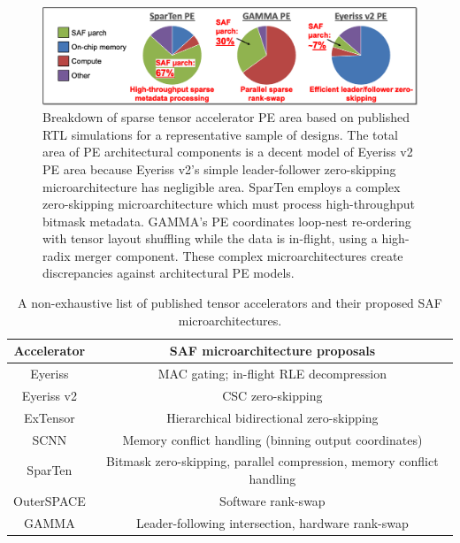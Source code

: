 %
%
\begin{figure}[ht]
\includegraphics[width=\textwidth]{figures/saf_uarch_significance.PNG}
\caption{Breakdown of sparse tensor accelerator PE area based on published RTL simulations for a representative sample of designs. The total area of PE architectural components is a decent model of Eyeriss v2\cite{eyerissv2} PE area because Eyeriss v2's simple leader-follower zero-skipping microarchitecture has negligible area. SparTen\cite{sparten} employs a complex zero-skipping microarchitecture which must process high-throughput bitmask metadata. GAMMA's\cite{gamma} PE coordinates loop-nest re-ordering with tensor layout shuffling while the data is in-flight, using a high-radix merger component. These complex microarchitectures create discrepancies against architectural PE models.}
\label{fig:saf_uarch_significance}
\centering
\end{figure}
%
%
\begin{table}[ht]
\begin{tabular}{c|c|}
\textbf{Accelerator} & \textbf{SAF microarchitecture proposals} \\ \hline \hline
Eyeriss &  MAC gating; in-flight RLE decompression \\ \hline
Eyeriss v2 & CSC zero-skipping \\ \hline
ExTensor & Hierarchical bidirectional zero-skipping \\ \hline
SCNN & Memory conflict handling (binning output coordinates) \\ \hline
SparTen & Bitmask zero-skipping, parallel compression, memory conflict handling \\ \hline
OuterSPACE & Software rank-swap \\ \hline
GAMMA & Leader-following intersection, hardware rank-swap \\ \hline
\end{tabular}
\caption{A non-exhaustive list of published tensor accelerators and their proposed SAF microarchitectures.}
\label{tab:design_specific_models}
\centering
\end{table}

